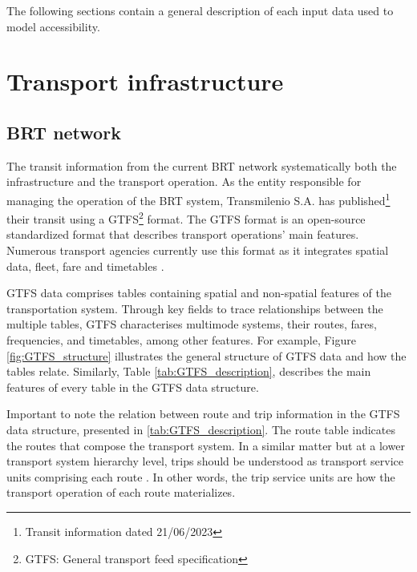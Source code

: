 \documentclass[12pt, a4paper]{report}
\begin{document}
The following sections contain a general description of each input data used to model accessibility.





\section{Transport infrastructure}

\subsection{BRT network}

The transit information from the current BRT network systematically both the infrastructure and the transport operation. As the entity responsible for managing the operation of the BRT system, Transmilenio S.A. has published\footnote{Transit information dated 21/06/2023} their transit using a GTFS\footnote{GTFS: General transport feed specification} format. The GTFS format is an open-source standardized format that describes transport operations' main features. Numerous transport agencies currently use this format as it integrates spatial data, fleet, fare and timetables \citep{pereiraIntroductionUrbanAccessibility2023a, mobiltydataGeneralTransitFeed2023}.

GTFS data comprises tables containing spatial and non-spatial features of the transportation system. Through key fields to trace relationships between the multiple tables, GTFS characterises multimode systems, their routes, fares, frequencies, and timetables, among other features. For example, Figure \ref{fig:GTFS_structure} illustrates the general structure of GTFS data and how the tables relate. Similarly, Table \ref{tab:GTFS_description}, describes the main features of every table in the GTFS data structure.

Important to note the relation between route and trip information in the GTFS data structure, presented in \ref{tab:GTFS_description}. The route table indicates the routes that compose the transport system. In a similar matter but at a lower transport system hierarchy level, trips should be understood as transport service units comprising each route \citep{pereiraIntroductionUrbanAccessibility2023a}. In other words, the trip service units are how the transport operation of each route materializes.
\end{document}
